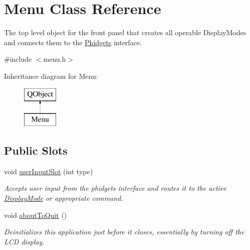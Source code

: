 \hypertarget{class_menu}{\section{Menu Class Reference}
\label{class_menu}
}


The top level object for the front panel that creates all operable Display\-Modes and connects them to the \hyperlink{class_phidgets}{Phidgets} interface.  




{\ttfamily \#include $<$menu.\-h$>$}

Inheritance diagram for Menu\-:\begin{figure}[H]
\begin{center}
\leavevmode
\includegraphics[height=2.000000cm]{class_menu}
\end{center}
\end{figure}
\subsection*{Public Slots}
\begin{DoxyCompactItemize}
\item 
void \hyperlink{class_menu_a3a8a0e8b13f44978f239e280d78b38bd}{user\-Input\-Slot} (int type)
\begin{DoxyCompactList}\small\item\em Accepts user input from the phidgets interface and routes it to the active \hyperlink{class_display_mode}{Display\-Mode} or appropriate command. \end{DoxyCompactList}\item 
\hypertarget{class_menu_a83b4027ae502520a6c94891eb2052d02}{void \hyperlink{class_menu_a83b4027ae502520a6c94891eb2052d02}{about\-To\-Quit} ()}\label{class_menu_a83b4027ae502520a6c94891eb2052d02}

\begin{DoxyCompactList}\small\item\em Deinitializes this application just before it closes, essentially by turning off the L\-C\-D display. \end{DoxyCompactList}\end{DoxyCompactItemize}
